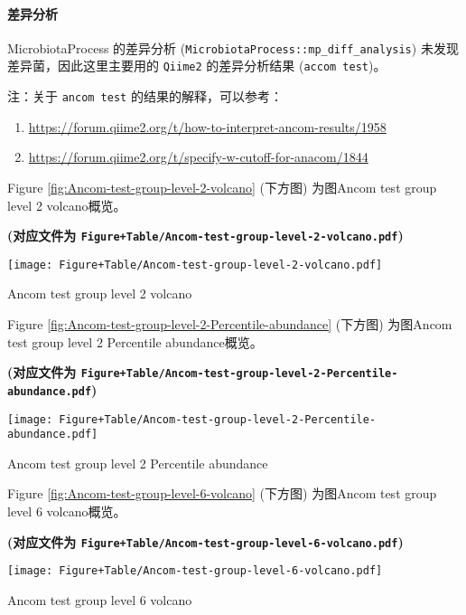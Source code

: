 \documentclass[
]{article}
\providecommand{\tightlist}{%
  \setlength{\itemsep}{0pt}\setlength{\parskip}{0pt}}
\begin{document}
\hypertarget{ux5deeux5f02ux5206ux6790}{%
\paragraph{差异分析}\label{ux5deeux5f02ux5206ux6790}}

MicrobiotaProcess 的差异分析 (\texttt{MicrobiotaProcess::mp\_diff\_analysis}) 未发现差异菌，因此这里主要用的
\texttt{Qiime2} 的差异分析结果 (\texttt{accom\ test})。

注：关于 \texttt{ancom\ test} 的结果的解释，可以参考：

\begin{enumerate}
\def\labelenumi{\arabic{enumi}.}
\tightlist
\item
  \url{https://forum.qiime2.org/t/how-to-interpret-ancom-results/1958}
\item
  \url{https://forum.qiime2.org/t/specify-w-cutoff-for-anacom/1844}
\end{enumerate}

Figure \ref{fig:Ancom-test-group-level-2-volcano} (下方图) 为图Ancom test group level 2 volcano概览。

\textbf{(对应文件为 \texttt{Figure+Table/Ancom-test-group-level-2-volcano.pdf})}

\def\@captype{figure}
\begin{center}
\texttt{[image: Figure+Table/Ancom-test-group-level-2-volcano.pdf]}
\caption{Ancom test group level 2 volcano}\label{fig:Ancom-test-group-level-2-volcano}
\end{center}

Figure \ref{fig:Ancom-test-group-level-2-Percentile-abundance} (下方图) 为图Ancom test group level 2 Percentile abundance概览。

\textbf{(对应文件为 \texttt{Figure+Table/Ancom-test-group-level-2-Percentile-abundance.pdf})}

\def\@captype{figure}
\begin{center}
\texttt{[image: Figure+Table/Ancom-test-group-level-2-Percentile-abundance.pdf]}
\caption{Ancom test group level 2 Percentile abundance}\label{fig:Ancom-test-group-level-2-Percentile-abundance}
\end{center}

Figure \ref{fig:Ancom-test-group-level-6-volcano} (下方图) 为图Ancom test group level 6 volcano概览。

\textbf{(对应文件为 \texttt{Figure+Table/Ancom-test-group-level-6-volcano.pdf})}

\def\@captype{figure}
\begin{center}
\texttt{[image: Figure+Table/Ancom-test-group-level-6-volcano.pdf]}
\caption{Ancom test group level 6 volcano}\label{fig:Ancom-test-group-level-6-volcano}
\end{center}
\end{document}
